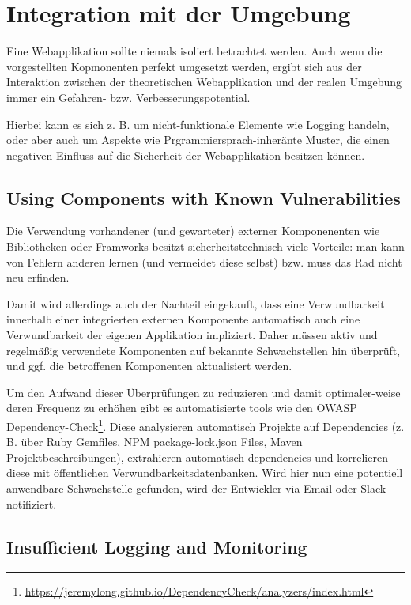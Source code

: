 \chapter{Integration mit der Umgebung}

Eine Webapplikation sollte niemals isoliert betrachtet werden. Auch wenn die vorgestellten Kopmonenten perfekt umgesetzt werden, ergibt sich aus der Interaktion zwischen der theoretischen Webapplikation und der realen Umgebung immer ein Gefahren- bzw. Verbesserungspotential.

Hierbei kann es sich z. B. um nicht-funktionale Elemente wie Logging handeln, oder aber auch um Aspekte wie Prgrammiersprach-inheränte Muster, die einen negativen Einfluss auf die Sicherheit der Webapplikation besitzen können.

\section{Using Components with Known Vulnerabilities}

Die Verwendung vorhandener (und gewarteter) externer Komponenenten wie Bibliotheken oder Framworks besitzt sicherheitstechnisch viele Vorteile: man kann von Fehlern anderen lernen (und vermeidet diese selbst) bzw. muss das Rad nicht neu erfinden.

Damit wird allerdings auch der Nachteil eingekauft, dass eine Verwundbarkeit innerhalb einer integrierten externen Komponente automatisch auch eine Verwundbarkeit der eigenen Applikation impliziert. Daher müssen aktiv und regelmäßig verwendete Komponenten auf bekannte Schwachstellen hin überprüft, und ggf. die betroffenen Komponenten aktualisiert werden.

Um den Aufwand dieser Überprüfungen zu reduzieren und damit optimaler-weise deren Frequenz zu erhöhen gibt es automatisierte tools wie den OWASP Dependency-Check\footnote{\url{https://jeremylong.github.io/DependencyCheck/analyzers/index.html}}. Diese analysieren automatisch Projekte auf Dependencies (z. B. über Ruby Gemfiles, NPM package-lock.json Files, Maven Projektbeschreibungen), extrahieren automatisch dependencies und korrelieren diese mit öffentlichen Verwundbarkeitsdatenbanken. Wird hier nun eine potentiell anwendbare Schwachstelle gefunden, wird der Entwickler via Email oder Slack notifiziert.

\section{Insufficient Logging and Monitoring}

